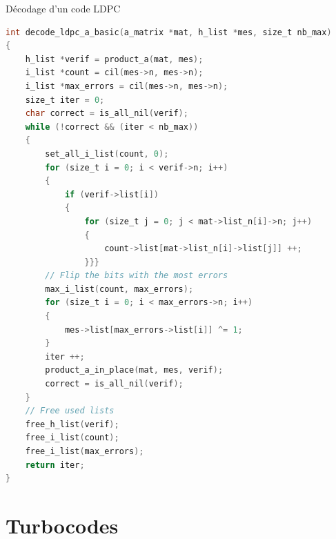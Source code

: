 \documentclass[11pt]{beamer}
\begin{document}
\begin{frame}{D\'ecodage d'un code LDPC}
	\begin{lstlisting}[language=C]
int decode_ldpc_a_basic(a_matrix *mat, h_list *mes, size_t nb_max)
{
    h_list *verif = product_a(mat, mes);
    i_list *count = cil(mes->n, mes->n);
    i_list *max_errors = cil(mes->n, mes->n);
    size_t iter = 0;
    char correct = is_all_nil(verif);
    while (!correct && (iter < nb_max))
    {
        set_all_i_list(count, 0);
        for (size_t i = 0; i < verif->n; i++)
        {
            if (verif->list[i])
            {
                for (size_t j = 0; j < mat->list_n[i]->n; j++)
                {
                    count->list[mat->list_n[i]->list[j]] ++;
                }}}
        // Flip the bits with the most errors
        max_i_list(count, max_errors);
        for (size_t i = 0; i < max_errors->n; i++)
        {
            mes->list[max_errors->list[i]] ^= 1;
        }
        iter ++;
        product_a_in_place(mat, mes, verif);
        correct = is_all_nil(verif);
    }
    // Free used lists
    free_h_list(verif);
    free_i_list(count);
    free_i_list(max_errors);
    return iter;
}
	\end{lstlisting}
\end{frame}


\section{Turbocodes}
\end{document}
